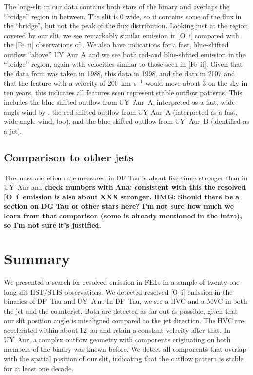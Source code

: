 \documentclass[twocolumn]{aastex62}
\begin{document}
The long-slit in our data contains both stars of the binary and overlaps the ``bridge'' region in between. The slit is 0 wide, so it contains some of the flux in the ``bridge'', but not the peak of the flux distribution. Looking just at the region covered by our slit, we see remarkably similar emission in [O~{\sc i}] compared with the [Fe~{\sc ii}] observations of \citet{2014ApJ...786...63P}. We also have indications for a fast, blue-shifted outflow ``above'' UY Aur~A and we see both red-and blue-shfited emission in the ``bridge'' region, again with velocities similar to those seen in [Fe~{\sc ii}]. Given that the data from \citet{1997A&AS..126..437H} was taken in 1988, this data in 1998, and the \citet{2014ApJ...786...63P} data in 2007 and that the feature with a velocity of 200~km~s$^{-1}$ would move about 3\arcsec{} on the sky in ten years, this indicates all features seen represent stable outflow patterns. This includes the blue-shifted outflow from UY~Aur~A, interpreted as a fast, wide angle wind by \citet{2014ApJ...786...63P}, the red-shifted outflow from UY Aur~A (interpreted as a fast, wide-angle wind, too), and the blue-shifted outflow from UY~Aur~B (identified as a jet).

\subsection{Comparison to other jets}
The mass accretion rate measured in DF Tau is about five times stronger than in UY~Aur \citet{2003ApJ...583..334H} and \textbf{check numbers with Ana: consistent with this the resolved [O~{\sc i}] emission is also about XXX stronger.} 
\textbf{HMG: Should there be a section on DG Tau or other stars here? I'm not sure how much we learn from that comparison (some is already mentioned in the intro), so I'm not sure it's justified.}

\section{Summary}
\label{Sect:summary}
We presented a search for resolved emission in FELs in a sample of twenty one long-slit HST/STIS observations. We detected resolved [O~{\sc i}] emission in the binaries of DF~Tau and UY~Aur. In DF~Tau, we see a HVC and a MVC in both the jet and the counterjet. Both are detected as far out as possible, given that our slit position angle is misaligned compared to the jet direction. The HVC are accelerated within about 12~au and retain a constant velocity after that. In UY~Aur, a complex outflow geometry with components originating on both members of the binary was known before. We detect all components that overlap with the spatial position of our slit, indicating that the outflow pattern is stable for at least one decade.
\end{document}

